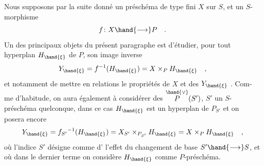 Nous supposons par la suite donné un préschéma de type fini $X$ sur $S$,
et un $S$-morphisme
\[ f\colon X\hand{\longrightarrow} P \quad . \]
Un des principaux objets du présent paragraphe est d'étudier, pour tout
hyperplan $H_{\hand{\xi}}$ de $P$,  son image inverse
\[ Y_{\hand{\xi}} = f^{-1}(H_{\hand{\xi}}) = X\times_P H_{\hand{\xi}} \quad , \]
et notamment de mettre en relations le propriétés de $X$ et des $Y_{\hand{\xi}}$ . Com-%
me d'habitude, on aura également à considérer des $\overset{\hand{\vee}}{P}(S')$, $S'$ 
un $S$-préschéma quelconque, dans ce cas $H_{\hand{\xi}}$ est un hyperplan de $P_{S'}$ \hand{,}
et on posera encore
\[ Y_{\hand{\xi}} = f_{S'}{}^{-1}(H_{\hand{\xi}}) = X_{S'}\times_{P_{S'}}H_{\hand{\xi}} = X\times_P H_{\hand{\xi}} \quad , \]
où l'indice $S'$ désigne comme d'  l'effet du changement de base
$S'\hand{\longrightarrow} S$, et où dans le dernier terme on considère $H_{\hand{\xi}}$ comme $P$-préschéma.


